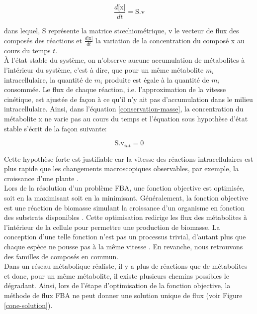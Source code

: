 \documentclass[../main.tex]{subfiles}
\begin{document}
\begin{equation}
\label{conservation-masse}
\frac{d\text{[x]}}{dt} = \text{S.v}
\end{equation}

dans lequel, S représente la matrice st\oe{}chiométrique, v le vecteur de flux des composés des réactions et $\frac{d\text{[x]}}{dt}$ la variation de la concentration du composé x au cours du temps $t$. \\

À l'état stable du système, on n'observe aucune accumulation de métabolites à l'intérieur du système, c'est à dire, que pour un même métabolite $m_i$ intracellulaire, la quantité de $m_i$ produite est égale à la quantité de $m_i$ consommée. Le flux de chaque réaction, i.e. l'approximation de la vitesse cinétique, est ajustée de façon à ce qu'il n'y ait pas d'accumulation dans le milieu intracellulaire. Ainsi, dans l'équation \ref{conservation-masse}, la concentration du métabolite x ne varie pas au cours du temps et l'équation sous hypothèse d'état stable s'écrit de la façon suivante: 

\begin{equation}
\text{S.v}_{int} = 0
\end{equation}

Cette hypothèse forte est justifiable car la vitesse des réactions intracellulaires est plus rapide que les changements macroscopiques observables, par exemple, la croissance d'une plante .\\

Lors de la résolution d'un problème FBA, une fonction objective est optimisée, soit en la maximisant soit en la minimisant. Généralement, la fonction objective est une réaction de biomasse simulant la croissance d'un organisme en fonction des substrats disponibles . Cette optimisation redirige les flux des métabolites à l'intérieur de la cellule pour permettre une production de biomasse. La conception d'une telle  fonction n'est pas un processus trivial, d'autant plus que chaque espèce ne pousse pas à la même vitesse . En revanche, nous retrouvons des familles de composés en commun\citep{FEIST2010344}. \\ 

Dans un réseau métabolique réaliste, il y a plus de réactions que de métabolites et donc, pour un même métabolite, il existe plusieurs chemins possibles le dégradant. Ainsi, lors de l'étape d'optimisation de la fonction objective, la méthode de flux FBA ne peut donner une solution unique de flux (voir Figure \ref{cone-solution}). 
\end{document}
